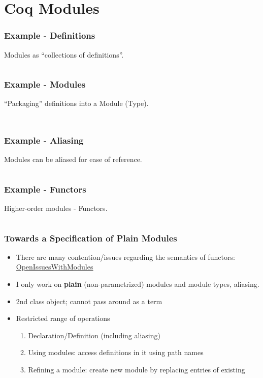\section{Coq Modules}

\begin{frame}
    \frametitle{Example - Definitions}
    Modules as ``collections of definitions''.
    \inputminted[firstline=1,lastline=10]{coq}{code/module_example.v}
\end{frame}

\begin{frame}
    \frametitle{Example - Modules}
    ``Packaging'' definitions into a Module (Type).
    \inputminted[firstline=11,lastline=16]{coq}{code/module_example.v}
    \inputminted[firstline=19,lastline=23]{coq}{code/module_example.v}
\end{frame}

\begin{frame}
    \frametitle{Example - Aliasing}
    Modules can be aliased for ease of reference.
    \inputminted[firstline=24,lastline=25]{coq}{code/module_example.v}
\end{frame}

\begin{frame}
    \frametitle{Example - Functors}
    Higher-order modules - Functors.
    \inputminted[firstline=27]{coq}{code/module_example.v}
\end{frame}

\begin{frame}
    \frametitle{Towards a Specification of Plain Modules}
    \begin{itemize}
    \item There are many contention/issues regarding the semantics of functors:
    \underline{\href{https://github.com/coq/coq/wiki/OpenIssuesWithModules}{OpenIssuesWithModules}}
    \pause
    \item I only work on \textbf{plain} (non-parametrized) modules and module types, aliasing.
    \pause
    \item 2nd class object; cannot pass around as a term
    \item Restricted range of operations
    \begin{enumerate}
    \item Declaration/Definition (including aliasing)
    \item Using modules: access definitions in it using path names
    \item Refining a module: create new module by replacing entries of existing
    \end{enumerate}
    \end{itemize}
\end{frame}

